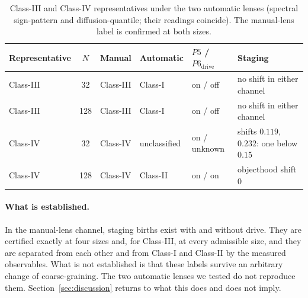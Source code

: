 \begin{table}[tbp]
\centering
\small
\caption{Class-III and Class-IV representatives under the two automatic lenses (spectral sign-pattern and diffusion-quantile; their readings coincide). The manual-lens label is confirmed at both sizes.}
\label{tab:class-iii-iv-lens-caveat}
\setlength{\tabcolsep}{4pt}
\begin{tabularx}{\linewidth}{@{}l c l l l Y@{}}
\toprule
Representative & $N$ & Manual & Automatic & $P5$ / $P6_{\mathrm{drive}}$ & Staging \\
\midrule
Class-III & 32  & Class-III & Class-I      & on / off     & no shift in either channel \\
Class-III & 128 & Class-III & Class-I      & on / off     & no shift in either channel \\
Class-IV  & 32  & Class-IV  & unclassified & on / unknown & shifts $0.119$, $0.232$: one below $0.15$ \\
Class-IV  & 128 & Class-IV  & Class-II     & on / on      & objecthood shift $0$ \\
\bottomrule
\end{tabularx}
\end{table}

\paragraph{What is established.} In the manual-lens channel, staging births exist with and without drive. They are certified exactly at four sizes and, for Class-III, at every admissible size, and they are separated from each other and from Class-I and Class-II by the measured observables. What is not established is that these labels survive an arbitrary change of coarse-graining. The two automatic lenses we tested do not reproduce them. Section~\ref{sec:discussion} returns to what this does and does not imply.
